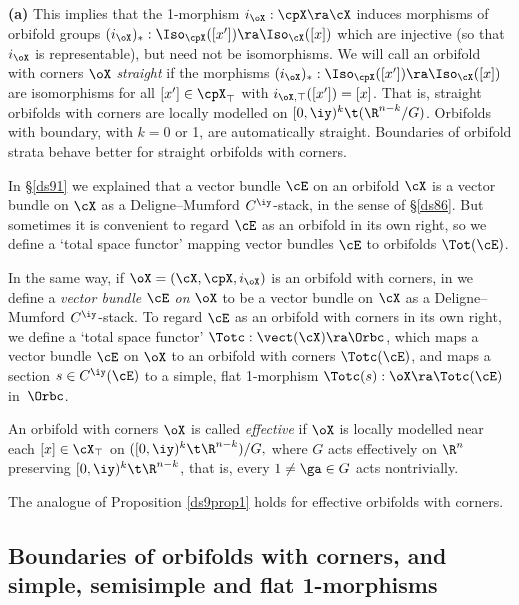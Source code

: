 \documentclass{article}
\begin{document}
\begin{rem}{\bf(a)}
This implies that the 1-morphism $i_\oX:\cpX\ra\cX$ induces
morphisms of orbifold groups $(i_\oX)_*:\Iso_\cpX([x'])\ra
\Iso_\cX([x])$ which are injective (so that $i_\oX$ is
representable), but need not be isomorphisms. We will call an
orbifold with corners $\oX$ {\it straight\/} if the morphisms $(i_\oX)_*:\Iso_\cpX([x'])\ra
\Iso_\cX([x])$ are isomorphisms for all $[x']\in\cpX_\top$ with
$i_{\oX,\top}([x'])=[x]$. That is, straight orbifolds with corners
are locally modelled on $[0,\iy)^k\t(\R^{n-k}/G)$. Orbifolds with
boundary, with $k=0$ or 1, are
automatically straight. Boundaries of orbifold strata behave better
for straight orbifolds with corners.
\label{ds12rem}
\end{rem}

In \S\ref{ds91} we explained that a  vector bundle $\cE$ on an
orbifold $\cX$ is a vector bundle on $\cX$ as a Deligne--Mumford
$C^\iy$-stack, in the sense of \S\ref{ds86}. But sometimes it is
convenient to regard $\cE$ as an orbifold in its own right, so we
define a `total space functor' mapping vector bundles $\cE$ to
orbifolds $\Tot(\cE)$.

In the same way, if $\oX=(\cX,\cpX,i_\oX)$ is an orbifold with
corners, in \cite[\S 8.5]{Joyc6} we define a {\it vector bundle\/
$\cE$ on\/} $\oX$ to be a
vector bundle on $\cX$ as a Deligne--Mumford $C^\iy$-stack. To
regard $\cE$ as an orbifold with corners in its own right, we define
a `total space functor' $\Totc:\vect(\cX)\ra\Orbc$, which
maps a vector bundle $\cE$ on $\oX$ to an orbifold with corners
$\Totc(\cE)$, and maps a section $s\in C^\iy(\cE)$ to a simple, flat
1-morphism $\Totc(s):\oX\ra\Totc(\cE)$ in~$\Orbc$.

\begin{dfn} An orbifold with corners $\oX$ is called {\it
effective\/} if $\oX$ is locally
modelled near each $[x]\in\cX_\top$ on $([0,\iy)^k\t\R^{n-k})/G,$
where $G$ acts effectively on $\R^n$ preserving
$[0,\iy)^k\t\R^{n-k}$, that is, every $1\ne\ga\in G$ acts
nontrivially.
\label{ds12def2}
\end{dfn}

The analogue of Proposition \ref{ds9prop1} holds for effective
orbifolds with corners.

\subsection{Boundaries of orbifolds with corners, and \\ simple,
semisimple and flat 1-morphisms}
\label{ds122}
\end{document}
